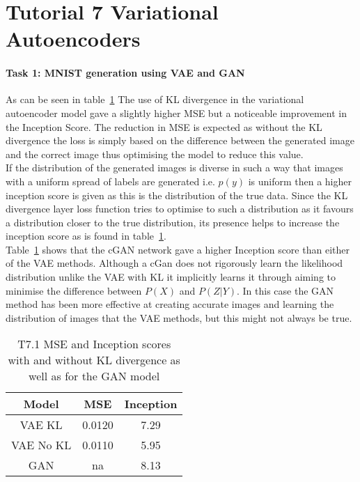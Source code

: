 \documentclass[10pt,twocolumn,letterpaper]{article}
\begin{document}

\section{Tutorial 7 Variational Autoencoders}

\paragraph{Task 1: MNIST generation using VAE and GAN}


As can be seen in table~\ref*{table:t71} The use of KL divergence in the variational autoencoder model gave a slightly higher MSE but a noticeable improvement in the Inception Score. The reduction in MSE is expected as without the KL divergence the loss is simply based on the difference between the generated image and the correct image thus optimising the model to reduce this value\cite{vae}. \\
If the distribution of the generated images is diverse in such a way that  images with a uniform spread of labels are generated i.e. $p(y)$ is uniform then a higher inception score is given\cite{kl-divergence} as this is the distribution of the true data. Since the KL divergence layer loss function tries to optimise to such a distribution\cite{kl-divergence} as it favours a distribution closer to the true distribution, its presence helps to increase the inception score as is found in table~\ref*{table:t71}. \\
Table~\ref*{table:t71} shows that the cGAN network gave a higher Inception score than either of the VAE methods. Although a cGan does not rigorously learn the likelihood distribution unlike the VAE with KL it implicitly learns it through aiming to minimise the difference between $P(X)$ and $P(Z|Y)$\cite{gan}. In this case the GAN method has been more effective at creating accurate images and learning the distribution of images that the VAE methods, but this might not always be true.

\begin{table}[ht]
    \small
    \centering
    \begin{tabular}{|c|c|c|}
        \hline
        Model     & MSE & Inception \\
        \hline
        VAE KL & 0.0120 & 7.29 \\
        VAE No KL & 0.0110 & 5.95 \\
        GAN & na & 8.13 \\
        \hline
    \end{tabular}
    \medbreak
    \caption{T7.1 MSE and Inception scores with and without KL divergence as well as for the GAN model}
    \label{table:t71}
    \vspace{-0.7cm}
\end{table}
\end{document}
